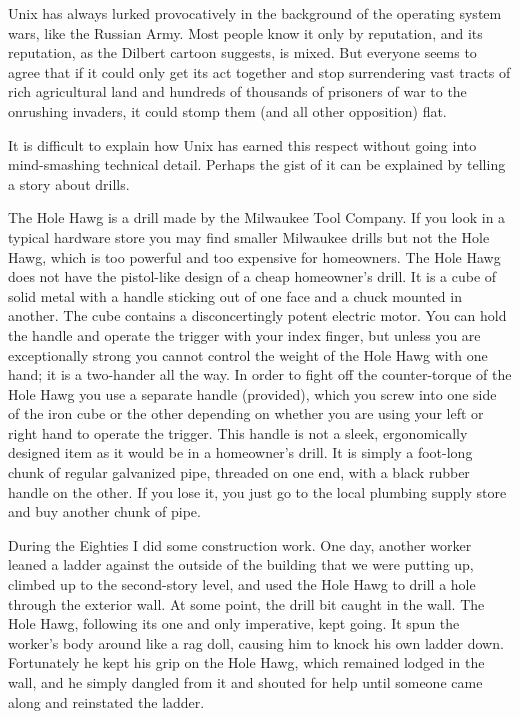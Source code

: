 \documentclass[
  fontsize=11pt,
  paper=landscape,
  twocolumn=true,
  pagesize=pdftex,
  headings=small,
  DIV=15,
  ]{scrartcl}
\begin{document}
Unix has always lurked provocatively in the background of the operating
system wars, like the Russian Army. Most people know it only by
reputation, and its reputation, as the Dilbert cartoon suggests, is
mixed. But everyone seems to agree that if it could only get its act
together and stop surrendering vast tracts of rich agricultural land and
hundreds of thousands of prisoners of war to the onrushing invaders, it
could stomp them (and all other opposition) flat.

It is difficult to explain how Unix has earned this respect without
going into mind-smashing technical detail. Perhaps the gist of it can be
explained by telling a story about drills.

The Hole Hawg is a drill made by the Milwaukee Tool Company. If you look
in a typical hardware store you may find smaller Milwaukee drills but
not the Hole Hawg, which is too powerful and too expensive for
homeowners. The Hole Hawg does not have the pistol-like design of a
cheap homeowner's drill. It is a cube of solid metal with a handle
sticking out of one face and a chuck mounted in another. The cube
contains a disconcertingly potent electric motor. You can hold the
handle and operate the trigger with your index finger, but unless you
are exceptionally strong you cannot control the weight of the Hole Hawg
with one hand; it is a two-hander all the way. In order to fight off the
counter-torque of the Hole Hawg you use a separate handle (provided),
which you screw into one side of the iron cube or the other depending on
whether you are using your left or right hand to operate the trigger.
This handle is not a sleek, ergonomically designed item as it would be
in a homeowner's drill. It is simply a foot-long chunk of regular
galvanized pipe, threaded on one end, with a black rubber handle on the
other. If you lose it, you just go to the local plumbing supply store
and buy another chunk of pipe.

During the Eighties I did some construction work. One day, another
worker leaned a ladder against the outside of the building that we were
putting up, climbed up to the second-story level, and used the Hole Hawg
to drill a hole through the exterior wall. At some point, the drill bit
caught in the wall. The Hole Hawg, following its one and only
imperative, kept going. It spun the worker's body around like a rag
doll, causing him to knock his own ladder down. Fortunately he kept his
grip on the Hole Hawg, which remained lodged in the wall, and he simply
dangled from it and shouted for help until someone came along and
reinstated the ladder.
\end{document}
